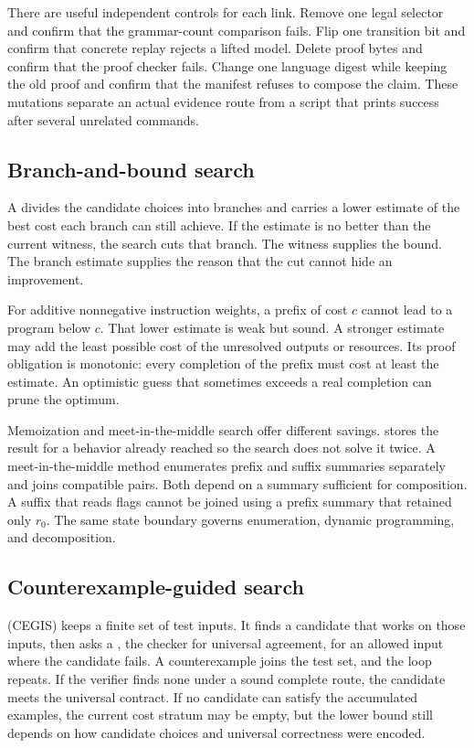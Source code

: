 There are useful independent controls for each link. Remove one legal selector
and confirm that the grammar-count comparison fails. Flip one transition bit
and confirm that concrete replay rejects a lifted model. Delete proof bytes
and confirm that the proof checker fails. Change one language digest while
keeping the old proof and confirm that the manifest refuses to compose the
claim. These mutations separate an actual evidence route from a script that
prints success after several unrelated commands.

\subsection{Branch-and-bound search}

A  divides the candidate choices into
branches and carries a lower estimate of the best cost each branch can still
achieve. If the estimate is no better than the current witness, the search
cuts that branch. The witness supplies the bound. The branch estimate supplies
the reason that the cut cannot hide an improvement.

For additive nonnegative instruction weights, a prefix of cost \(c\) cannot
lead to a program below \(c\). That lower estimate is weak but sound. A
stronger estimate may add the least possible cost of the unresolved outputs or
resources. Its proof obligation is monotonic: every completion of the prefix
must cost at least the estimate. An optimistic guess that sometimes exceeds a
real completion can prune the optimum.

Memoization and meet-in-the-middle search offer different savings.
 stores the result for a behavior already reached so the
search does not solve it twice. A meet-in-the-middle method enumerates prefix
and suffix summaries separately and joins compatible pairs. Both depend on a
summary sufficient for composition. A suffix that reads flags cannot be
joined using a prefix summary that retained only \(r_0\). The same state
boundary governs enumeration, dynamic programming, and decomposition.

\subsection{Counterexample-guided search}

 (CEGIS) keeps a finite set
of test inputs. It finds a candidate that works on those inputs, then asks a
, the checker for universal agreement, for an allowed input
where the candidate fails. A counterexample joins the test set, and the loop
repeats. If the verifier finds none under a sound complete route, the
candidate meets the universal contract. If no candidate can satisfy the
accumulated examples, the current cost stratum may be empty, but the lower
bound still depends on how candidate choices and universal correctness were
encoded.

